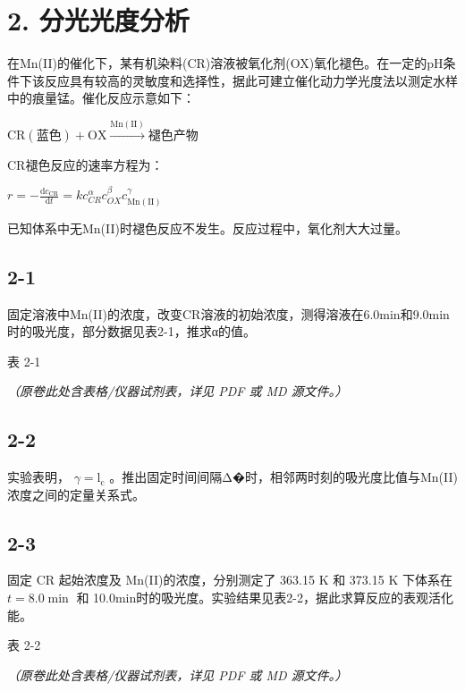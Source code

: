 \section*{2. 分光光度分析}
在Mn(II)的催化下，某有机染料(CR)溶液被氧化剂(OX)氧化褪⾊。在⼀定的pH条件下该反应具有较⾼的灵敏度和选择性，据此可建⽴催化动⼒学光度法以测定⽔样中的痕量锰。催化反应⽰意如下：

$
\mathrm{CR} (\text {蓝色}) + \mathrm{OX} \xrightarrow {\mathrm{Mn(II)}} \text {褪色产物}
$

CR褪⾊反应的速率⽅程为：

$
r = - \frac {\mathrm{d} c _ {\mathrm{CR}}}{\mathrm{d} t} = k c _ {C R} ^ {\alpha} c _ {O X} ^ {\beta} c _ {\mathrm{Mn(II)}} ^ {\gamma}
$

已知体系中⽆Mn(II)时褪⾊反应不发⽣。反应过程中，氧化剂⼤⼤过量。

\subsection*{2-1}
固定溶液中Mn(II)的浓度，改变CR溶液的初始浓度，测得溶液在6.0min和9.0min时的吸光度，部分数据⻅表2-1，推求α的值。

表 2-1

\textit{（原卷此处含表格/仪器试剂表，详见 PDF 或 MD 源文件。）}

\subsection*{2-2}
实验表明， $\gamma = \mathrm { l _ { c } }$ 。推出固定时间间隔Δ�时，相邻两时刻的吸光度⽐值与Mn(II)浓度之间的定量关系式。

\subsection*{2-3}
固定 CR 起始浓度及 Mn(II)的浓度，分别测定了 363.15 K 和 373.15 K 下体系在 $t = 8 . 0 \operatorname* { m i n }$ 和 10.0min时的吸光度。实验结果⻅表2-2，据此求算反应的表观活化能。

表 2-2

\textit{（原卷此处含表格/仪器试剂表，详见 PDF 或 MD 源文件。）}
